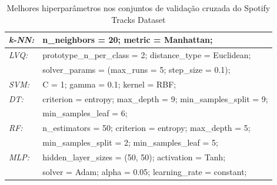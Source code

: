 \documentclass[journal]{IEEEtran}
\begin{document}
\begin{table}[h!]
	\caption{Melhores hiperparâmetros nos conjuntos de validação cruzada do Spotify Tracks Dataset}
	\label{tab:20}
	\begin{tabular}{ l l }
		\hline
		\textit{k-NN:} & n\_neighbors = 20; metric = Manhattan;                        \\
		\hline
		\textit{LVQ:}  & prototype\_n\_per\_class = 2; distance\_type = Euclidean;     \\  & solver\_params = (max\_runs = 5; step\_size = 0.1);\\
		\hline
		\textit{SVM:}  & C = 1; gamma = 0.1; kernel = RBF;                             \\
		\hline
		\textit{DT:}   & criterion = entropy; max\_depth = 9; min\_samples\_split = 9; \\  & min\_samples\_leaf = 6;\\
		\hline
		\textit{RF:}   & n\_estimators = 50; criterion = entropy; max\_depth = 5;      \\  & min\_samples\_split = 2; min\_samples\_leaf = 5;\\
		\hline
		\textit{MLP:}  & hidden\_layer\_sizes = (50, 50); activation = Tanh;           \\  & solver = Adam; alpha = 0.05; learning\_rate = constant;\\
		\hline
	\end{tabular}
\end{table}
\end{document}
